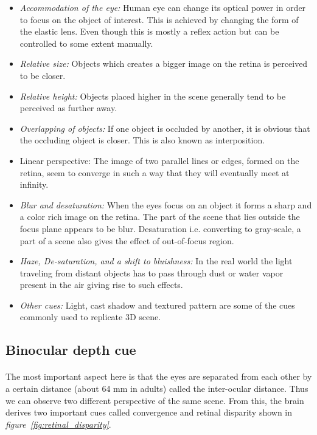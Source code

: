 \begin{itemize}
  \item \emph{Accommodation of the eye:} Human eye can change its optical power in order to focus on the object of interest. This is achieved by changing the form of the elastic lens. Even though this is mostly a reflex action but can be controlled to some extent manually.
  
  \item \emph{Relative size:} Objects which creates a bigger image on the retina is perceived to be closer.
  
  \item \emph{Relative height:} Objects placed higher in the scene generally tend to be perceived as further away.
  
	\item \emph{Overlapping of objects:} If one object is occluded by another, it is obvious that the occluding object is closer. This is also known as interposition.
		
	\item Linear perspective: The image of two parallel lines or edges, formed on the retina, seem to converge in such a way that they will eventually meet at infinity.
	
	\item \emph{Blur and desaturation:} When the eyes focus on an object it forms a sharp and a color rich image on the retina. The part of the scene that lies outside the focus plane appears to be blur. Desaturation i.e. converting to gray-scale, a part of a scene also gives the effect of out-of-focus region.
	
	\item \emph{Haze, De-saturation, and a shift to bluishness:} In the real world the light traveling from distant objects has to pass through dust or water vapor present in the air giving rise to such effects.
	
	\item \emph{Other cues:} Light, cast shadow and textured pattern are some of the cues commonly used to replicate 3D scene.
	
\end{itemize}

\subsection{Binocular depth cue}
\paragraph{}
The most important aspect here is that the eyes are separated from each other by a certain distance (about 64 mm in adults) called the inter-ocular distance. Thus we can observe two different perspective of the same scene. From this, the brain derives two important cues called convergence and retinal disparity shown in \textit{figure~\ref{fig:retinal_disparity}}.
 

